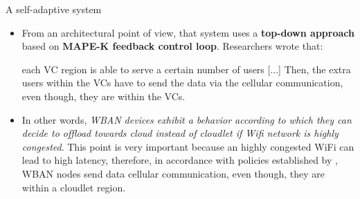\documentclass[10pt]{beamer}
\begin{document}
\begin{frame}{A self-adaptive system} 
 
\begin{itemize}
\item From an architectural point of view, that system uses a \textbf{top-down approach} based on \textbf{MAPE-K feedback control loop}. Researchers wrote that:

\vspace{0.3cm}

\begin{quoting}[font=itshape, begintext={``}, endtext={''\cite[par.~5.1]{MSAReport}}]
each VC region is able to serve a certain number of users [...] Then, the extra users within the VCs have to send the data via the cellular communication, even though, they are within the VCs. 
\end{quoting}

\vspace{0.3cm}

\item In other words, \textit{WBAN devices exhibit a behavior according to which they can decide to offload towards cloud instead of cloudlet if Wifi network is highly congested}. This point is very important because an highly congested WiFi can lead to high latency, therefore, in accordance with policies established by \citet{MSAReport}, WBAN nodes  send data cellular communication, even though, they are within a cloudlet region.  

\end{itemize}

\end{frame} 
\end{document}
